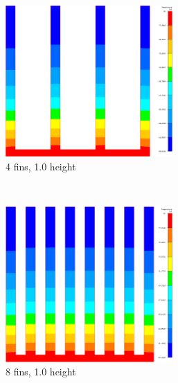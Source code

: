 \begin{figure}[ht]
\begin{subfigure}[t] {0.23\textwidth}
\centering
\includegraphics[width=0.7\textwidth]{../figures/heatsink4_h105_gmf005.png}
\caption{4 fins, \num{1.0} height}
\label{fig:mesh_temps_res_4_1}
\end{subfigure}
~
\begin{subfigure}[t] {0.23\textwidth}
\centering
\includegraphics[width=0.7\textwidth]{../figures/heatsink8_h105_gmf005.png}
\caption{8 fins, \num{1.0} height}
\label{fig:mesh_temps_res_8_1}
\end{subfigure}
~
\begin{subfigure}[t] {0.23\textwidth}
\centering

\end{subfigure}
\end{figure}
